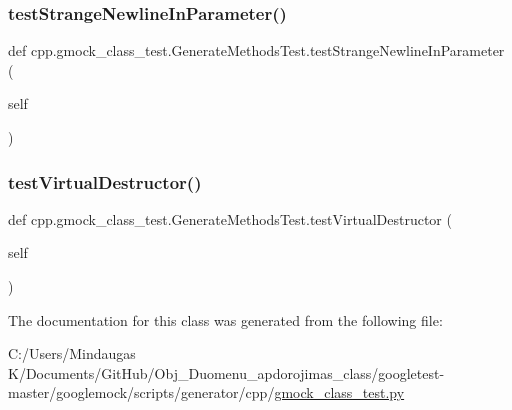 \subsubsection{\texorpdfstring{testStrangeNewlineInParameter()}{testStrangeNewlineInParameter()}}
{\footnotesize\ttfamily def cpp.\+gmock\+\_\+class\+\_\+test.\+Generate\+Methods\+Test.\+test\+Strange\+Newline\+In\+Parameter (\begin{DoxyParamCaption}\item[{}]{self }\end{DoxyParamCaption})}

\mbox{\label{classcpp_1_1gmock__class__test_1_1_generate_methods_test_a3095f7046a089b3c8a13e7e8161a2ab2}} 
\subsubsection{\texorpdfstring{testVirtualDestructor()}{testVirtualDestructor()}}
{\footnotesize\ttfamily def cpp.\+gmock\+\_\+class\+\_\+test.\+Generate\+Methods\+Test.\+test\+Virtual\+Destructor (\begin{DoxyParamCaption}\item[{}]{self }\end{DoxyParamCaption})}



The documentation for this class was generated from the following file\+:\begin{DoxyCompactItemize}
\item 
C\+:/\+Users/\+Mindaugas K/\+Documents/\+Git\+Hub/\+Obj\+\_\+\+Duomenu\+\_\+apdorojimas\+\_\+class/googletest-\/master/googlemock/scripts/generator/cpp/\mbox{\hyperlink{googletest-master_2googlemock_2scripts_2generator_2cpp_2gmock__class__test_8py}{gmock\+\_\+class\+\_\+test.\+py}}\end{DoxyCompactItemize}

